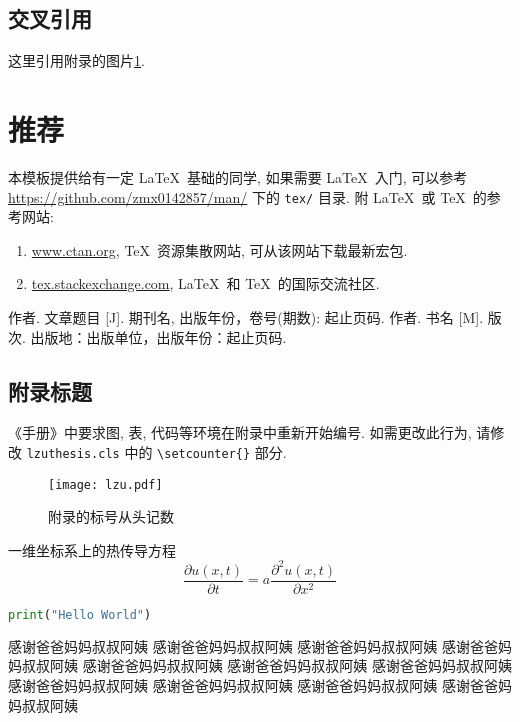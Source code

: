 \documentclass{lzuthesis}
\begin{document}
\subsection{交叉引用}

这里引用附录的图片\ref{fu1}. 

\section{推荐}

本模板提供给有一定 \LaTeX\ 基础的同学, 如果需要 \LaTeX\ 入门, 可以参考
\url{https://github.com/zmx0142857/man/} 下的 \verb|tex/| 目录.
附 \LaTeX\ 或 \TeX\ 的参考网站:
\begin{enumerate}
	\item \url{www.ctan.org}, \TeX\ 资源集散网站, 可从该网站下载最新宏包.
	\item \url{tex.stackexchange.com}, \LaTeX\ 和 \TeX\ 的国际交流社区.
\end{enumerate}

\begin{thebibliography}{00}
	 作者. 文章题目 [J].  期刊名, 出版年份，卷号(期数):
		起止页码.
	 作者. 书名 [M]. 版次.
		出版地：出版单位，出版年份：起止页码.
\end{thebibliography}

\begin{appendix}
	
\section{附录标题}

《手册》中要求图, 表, 代码等环境在附录中重新开始编号.  如需更改此行为,
请修改 \texttt{lzuthesis.cls} 中的 \verb|\setcounter{}| 部分. 

\begin{figure}[!h]
	\centering
	\texttt{[image: lzu.pdf]}
	\caption{附录的标号从头记数}
	\label{fu1}
\end{figure}

一维坐标系上的热传导方程
\begin{equation}
	\label{eq1}
	\frac{\partial u(x,t)}{\partial t}
	= a\frac{\partial ^{2}u(x,t)}{\partial x^{2}}
\end{equation}

\begin{lstlisting}[language=python, caption={helloworld.py}]
print("Hello World")
\end{lstlisting}
	
\end{appendix}

\begin{acknowledgement}
	感谢爸爸妈妈叔叔阿姨
	感谢爸爸妈妈叔叔阿姨
	感谢爸爸妈妈叔叔阿姨
	感谢爸爸妈妈叔叔阿姨
	感谢爸爸妈妈叔叔阿姨
	感谢爸爸妈妈叔叔阿姨
	感谢爸爸妈妈叔叔阿姨
	感谢爸爸妈妈叔叔阿姨
	感谢爸爸妈妈叔叔阿姨
	感谢爸爸妈妈叔叔阿姨
	感谢爸爸妈妈叔叔阿姨
\end{acknowledgement}

\makereviews
\end{document}
